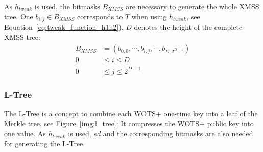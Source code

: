 As $h_{tweak}$ is used, the bitmasks $B_{XMSS}$ are necessary to generate the whole XMSS tree. One $b_{i,j} \in B_{XMSS}$ corresponds to $T$ when using $h_{tweak}$, see Equation~\ref{eq:tweak_function_h1h2}), $D$ denotes the height of the complete XMSS tree:
\begin{align}
B_{XMSS} &= (b_{0,0}, \cdots, b_{i,j}, \cdots, b_{D,2^{D-1}})  \\
0 &\leq i \leq D \nonumber \\ 
0 &\leq j \leq 2^{D-1} \nonumber
\end{align}

\subsubsection{L-Tree}
\label{sec:l_tree}
The L-Tree is a concept to combine each WOTS+ one-time key into a leaf of the Merkle tree, see Figure~\ref{img:l_tree}: It compresses the WOTS+ public key into one value. As $h_{tweak}$ is used, $sd$ and the corresponding bitmasks are also needed for generating the L-Tree.


